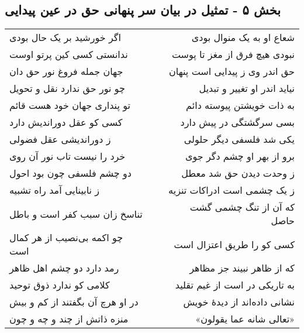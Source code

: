 \begin{center}
\section*{بخش ۵ - تمثیل در بیان سر پنهانی حق در عین پیدایی}
\label{sec:sh005}
\begin{longtable}{l p{0.5cm} r}
اگر خورشید بر یک حال بودی
&&
شعاع او به یک منوال بودی
\\
ندانستی کسی کین پرتو اوست
&&
نبودی هیچ فرق از مغز تا پوست
\\
جهان جمله فروغ نور حق دان
&&
حق اندر وی ز پیدایی است پنهان
\\
چو نور حق ندارد نقل و تحویل
&&
نیاید اندر او تغییر و تبدیل
\\
تو پنداری جهان خود هست قائم
&&
به ذات خویشتن پیوسته دائم
\\
کسی کو عقل دوراندیش دارد
&&
بسی سرگشتگی در پیش دارد
\\
ز دوراندیشی عقل فضولی
&&
یکی شد فلسفی دیگر حلولی
\\
خرد را نیست تاب نور آن روی
&&
برو از بهر او چشم دگر جوی
\\
دو چشم فلسفی چون بود احول
&&
ز وحدت دیدن حق شد معطل
\\
ز نابینایی آمد راه تشبیه
&&
ز یک چشمی است ادراکات تنزیه
\\
تناسخ زان سبب کفر است و باطل
&&
که آن از تنگ چشمی گشت حاصل
\\
چو اکمه بی‌نصیب از هر کمال است
&&
کسی کو را طریق اعتزال است
\\
رمد دارد دو چشم اهل ظاهر
&&
که از ظاهر نبیند جز مظاهر
\\
کلامی کو ندارد ذوق توحید
&&
به تاریکی در است از غیم تقلید
\\
در او هرچ آن بگفتند از کم و بیش
&&
نشانی داده‌اند از دیدهٔ خویش
\\
منزه ذاتش از چند و چه و چون
&&
«تعالی شانه عما یقولون»
\\
\end{longtable}
\end{center}
